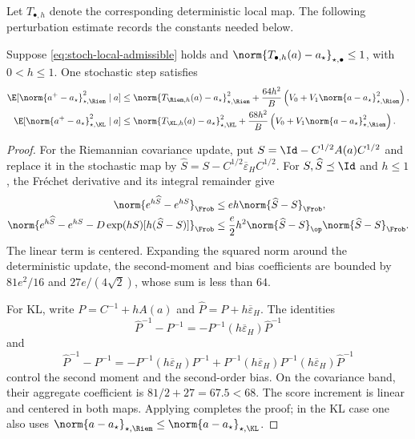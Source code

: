 Let \(T_{\bullet,h}\) denote the corresponding deterministic local map.
The following perturbation estimate records the constants needed below.

\begin{lemma}
\label{lem:stoch-local-perturbation}
Suppose \eqref{eq:stoch-local-admissible} holds and
\(\norm{T_{\bullet,h}(a)-a_\star}_{\star,\bullet}\leq1\), with
\(0<h\leq1\).  One stochastic step satisfies
\begin{align}
  \E[\norm{a^+-a_\star}_{\star,\Riem}^2\mid a]
  &\leq
  \norm{T_{\Riem,h}(a)-a_\star}_{\star,\Riem}^2
  +\frac{64h^2}{B}\left(V_0+V_1\norm{a-a_\star}_{\star,\Riem}^2\right),
  \label{eq:stoch-local-perturb-riemannian}\\
  \E[\norm{a^+-a_\star}_{\star,\KL}^2\mid a]
  &\leq
  \norm{T_{\KL,h}(a)-a_\star}_{\star,\KL}^2
  +\frac{68h^2}{B}\left(V_0+V_1\norm{a-a_\star}_{\star,\Riem}^2\right).
  \label{eq:stoch-local-perturb-kl}
\end{align}
\end{lemma}

\begin{proof}
For the Riemannian covariance update, put
\(S=\Id-C^{1/2}A(a)C^{1/2}\) and replace it in the stochastic map by
\(\widehat S=S-C^{1/2}\overline\varepsilon_HC^{1/2}\).  For
\(S,\widehat S\preceq\Id\) and \(h\leq1\), the Fr\'echet derivative and its
integral remainder give
\begin{align*}
  \norm{e^{h\widehat S}-e^{hS}}_{\Frob}
  &\leq eh\norm{\widehat S-S}_{\Frob},\\
  \norm{e^{h\widehat S}-e^{hS}
       -D\exp(hS)[h(\widehat S-S)]}_{\Frob}
  &\leq\frac e2h^2
  \norm{\widehat S-S}_{\op}\norm{\widehat S-S}_{\Frob}.
\end{align*}
The linear term is centered.  Expanding the squared norm around the
deterministic update, the second-moment and bias coefficients are bounded by
\(81e^2/16\) and \(27e/(4\sqrt2)\), whose sum is less than \(64\).

For KL, write
\(P=C^{-1}+hA(a)\) and
\(\widehat P=P+h\overline\varepsilon_H\).  The identities
\[
  \widehat P^{-1}-P^{-1}
  =-P^{-1}(h\overline\varepsilon_H)\widehat P^{-1}
\]
and
\[
  \widehat P^{-1}-P^{-1}
  =-P^{-1}(h\overline\varepsilon_H)P^{-1}
   +P^{-1}(h\overline\varepsilon_H)P^{-1}
    (h\overline\varepsilon_H)\widehat P^{-1}
\]
control the second moment and the second-order bias.  On the covariance
band, their aggregate coefficient is
\(81/2+27=67.5<68\).  The score increment is linear and centered in both
maps.  Applying  completes the proof; in the
KL case one also uses
\(\norm{a-a_\star}_{\star,\Riem}\leq
\norm{a-a_\star}_{\star,\KL}\).
\end{proof}

